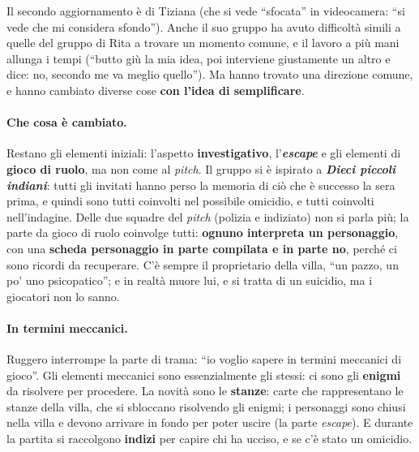 Il secondo aggiornamento è di Tiziana (che si vede ``sfocata'' in videocamera: ``si vede
che mi considera sfondo''). Anche il suo gruppo ha avuto difficoltà simili a quelle del
gruppo di Rita a trovare un momento comune, e il lavoro a più mani allunga i tempi
(``butto giù la mia idea, poi interviene giustamente un altro e dice: no, secondo me va
meglio quello''). Ma hanno trovato una direzione comune, e hanno cambiato diverse cose
\textbf{con l'idea di semplificare}.

\paragraph{Che cosa è cambiato.} Restano gli elementi iniziali: l'aspetto
\textbf{investigativo}, l'\textbf{\emph{escape}} e gli elementi di \textbf{gioco di
ruolo}, ma non come al \emph{pitch}. Il gruppo si è ispirato a \textbf{\emph{Dieci piccoli
indiani}}: tutti gli invitati hanno perso la memoria di ciò che è successo la sera prima,
e quindi sono tutti coinvolti nel possibile omicidio, e tutti coinvolti nell'indagine. Delle
due squadre del \emph{pitch} (polizia e indiziato) non si parla più; la parte da gioco di
ruolo coinvolge tutti:
\textbf{ognuno interpreta un personaggio}, con una \textbf{scheda personaggio in parte
compilata e in parte no}, perché ci sono ricordi da recuperare. C'è sempre il proprietario
della villa, ``un pazzo, un po' uno psicopatico''; e in realtà muore lui, e si tratta di
un suicidio, ma i giocatori non lo sanno.

\paragraph{In termini meccanici.} Ruggero interrompe la parte di trama: ``io voglio sapere
in termini meccanici di gioco''. Gli elementi meccanici sono essenzialmente gli stessi:
ci sono gli \textbf{enigmi} da risolvere per procedere. La novità sono le \textbf{stanze}:
carte che rappresentano le stanze della villa, che si sbloccano risolvendo gli enigmi;
i personaggi sono chiusi nella villa e devono arrivare in fondo per poter uscire (la parte
\emph{escape}). E durante la partita si raccolgono \textbf{indizi} per capire chi ha
ucciso, e se c'è stato un omicidio.

